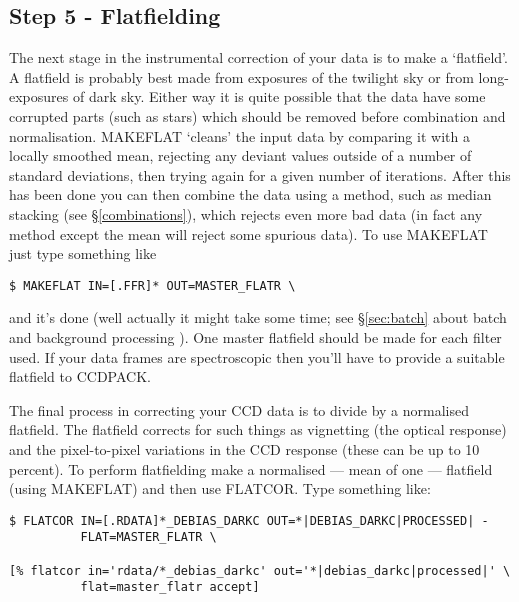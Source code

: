 \subsection{Step 5 - Flatfielding}

The next stage in the instrumental correction of your data is to make a 
`flatfield'. A flatfield is probably best made from exposures of the
twilight sky or from long-exposures of dark sky. Either way it is quite
possible that the data have some corrupted parts (such as stars) which
should be removed before combination and normalisation. MAKEFLAT
`cleans' the input data by comparing it with a locally smoothed mean,
rejecting any deviant values outside of a number of standard deviations,
then trying again for a given number of iterations. After this has been
done you can then combine the data using a method, such as median
stacking (see  \S\ref{combinations}), which rejects even more bad data
(in fact any method except the mean will reject some spurious data). To
use MAKEFLAT just type something like

\begin{myquote}
\begin{verbatim}
$ MAKEFLAT IN=[.FFR]* OUT=MASTER_FLATR \
\end{verbatim}
\end{myquote}

and it's done (well actually it might take some time; see
\S\ref{sec:batch} about batch and background processing ). One master
flatfield should be made for each filter used.  If your data frames are
spectroscopic then you'll have to provide a suitable flatfield to 
CCDPACK.

The final process in correcting your CCD data is to divide by a
normalised flatfield. The flatfield corrects for such things as
vignetting (the optical response) and the pixel-to-pixel variations in
the CCD response (these can be up to 10 percent). To perform
flatfielding make a normalised --- mean of one --- flatfield (using
MAKEFLAT) and then use FLATCOR. Type something like:

\begin{myquote}
\begin{verbatim}
$ FLATCOR IN=[.RDATA]*_DEBIAS_DARKC OUT=*|DEBIAS_DARKC|PROCESSED| -
          FLAT=MASTER_FLATR \

[% flatcor in='rdata/*_debias_darkc' out='*|debias_darkc|processed|' \
          flat=master_flatr accept]
\end{verbatim}
\end{myquote}


